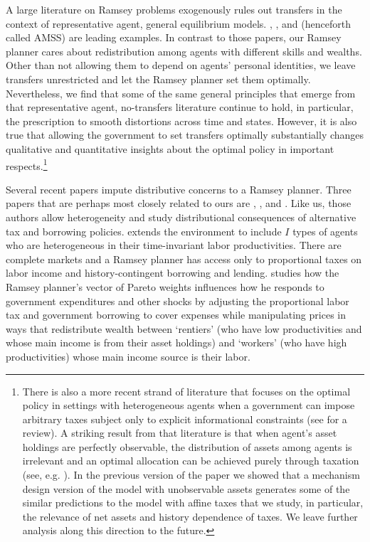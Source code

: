 \documentclass[thmsb,11pt]{article}
\begin{document}
 A large  literature on Ramsey problems  exogenously rules out transfers in the context of representative agent, general equilibrium models.
  \citet{LucasJr.1983}, \citet{Chari1994},  and \citet{Aiyagari2002} (henceforth called  AMSS) are leading  examples.
In contrast to those papers, our Ramsey planner cares about redistribution among
agents with different skills and wealths. Other than not allowing them to depend
on agents' personal identities, we leave   transfers unrestricted and let  the Ramsey planner set
them optimally. Nevertheless, we find that  some of the same general principles that emerge from that
representative agent, no-transfers literature continue to hold, in particular, the prescription to
smooth distortions across time and states.  However, it is also true that
allowing the government to set transfers optimally substantially changes
qualitative and quantitative insights about the optimal policy in important
respects.\footnote{ There is also a more recent strand of literature that focuses on the optimal policy in settings with
heterogeneous agents when a government can impose arbitrary taxes subject only
to explicit informational constraints (see \citet{golosov2007new} for a review). A striking result from that literature
is that when  agent's asset holdings are perfectly observable, the distribution of assets among
agents is irrelevant and an optimal allocation can be achieved purely through
taxation (see, e.g. \citet{Bassetto2004}).  In the previous version of the paper we showed that a mechanism design version of the model with unobservable assets generates some of the similar predictions to the model with affine taxes that we study, in particular, the relevance of net assets and history dependence of taxes. We leave further analysis along this
direction to the  future.}

Several recent papers impute distributive concerns to a Ramsey planner.
Three papers that are perhaps most closely related to ours are \citet{Bassetto1999}, \citet{shin2006ramsey}, and \citet{Wer07a}. Like us, those authors allow heterogeneity and study
distributional consequences of alternative tax and borrowing policies.
\citet{Bassetto1999} extends the \citet{LucasJr.1983} environment to include $I$ types of
agents who are heterogeneous in their time-invariant labor productivities. There are complete markets and a Ramsey planner  has access only
to proportional taxes on labor income and history-contingent borrowing and
lending. \citeauthor{Bassetto1999}  studies how the Ramsey planner's vector of Pareto weights
influences how he responds to government expenditures and other shocks by
adjusting the proportional labor tax and government borrowing to cover
expenses while manipulating prices in ways that redistribute wealth between
 `rentiers' (who have low productivities and  whose main income is from their asset holdings)
and  `workers' (who have high productivities) whose main income source is their labor.
\end{document}
